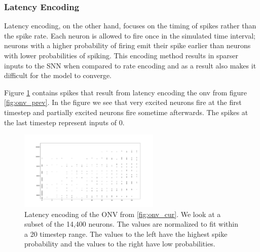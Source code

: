 \documentclass[../taasin.tex]{subfiles}
\begin{document}


\subsubsection{Latency Encoding}

Latency encoding, on the other hand, focuses on the timing of spikes rather than the spike rate. Each neuron is allowed to fire once in the simulated time interval; neurons with a higher probability of firing emit their spike earlier than neurons with lower probabilities of spiking. This encoding method results in sparser inputs to the SNN when compared to rate encoding and as a result also makes it difficult for the model to converge.

Figure \ref{fig:onv_encode_latency} contains spikes that result from latency encoding the onv from figure \ref{fig:onv_prev}. In the figure we see that very excited neurons fire at the first timestep and partially excited neurons fire sometime afterwards. The spikes at the last timestep represent inputs of 0.

\begin{figure}[h]
    \centering
    \includegraphics[width=0.6\textwidth]{figures/onv_latency_prev.pdf}
    \caption{Latency encoding of the ONV from \ref{fig:onv_cur}.  We look at a subset of the 14,400 neurons. The values are normalized to fit within a 20 timestep range. The values to the left have the highest spike probability and the values to the right have low probabilities.}
    \label{fig:onv_encode_latency}
\end{figure}

\end{document}
